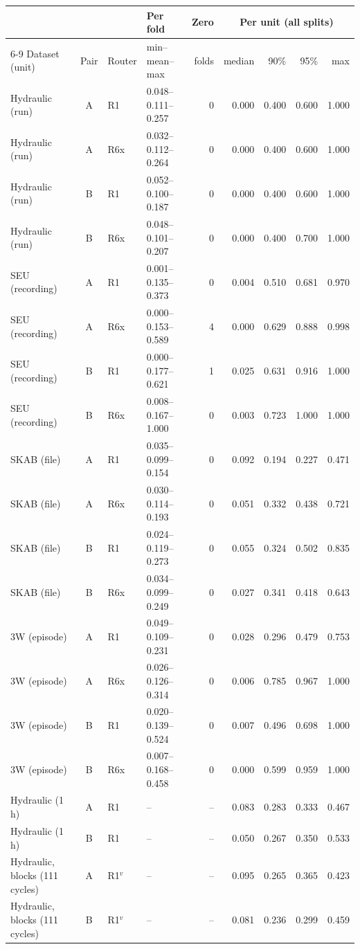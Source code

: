 \begin{tabular}{@{}l c l l r rrrr@{}}
\toprule
& & & Per fold & Zero & \multicolumn{4}{c}{Per unit (all splits)} \\
\cmidrule(l){6-9}
Dataset (unit) & Pair & Router & min--mean--max & folds & median & 90\% & 95\% & max \\
\midrule
Hydraulic (run) & A & R1 & 0.048--0.111--0.257 & 0 & 0.000 & 0.400 & 0.600 & 1.000 \\
Hydraulic (run) & A & R6x & 0.032--0.112--0.264 & 0 & 0.000 & 0.400 & 0.600 & 1.000 \\
Hydraulic (run) & B & R1 & 0.052--0.100--0.187 & 0 & 0.000 & 0.400 & 0.600 & 1.000 \\
Hydraulic (run) & B & R6x & 0.048--0.101--0.207 & 0 & 0.000 & 0.400 & 0.700 & 1.000 \\
SEU (recording) & A & R1 & 0.001--0.135--0.373 & 0 & 0.004 & 0.510 & 0.681 & 0.970 \\
SEU (recording) & A & R6x & 0.000--0.153--0.589 & 4 & 0.000 & 0.629 & 0.888 & 0.998 \\
SEU (recording) & B & R1 & 0.000--0.177--0.621 & 1 & 0.025 & 0.631 & 0.916 & 1.000 \\
SEU (recording) & B & R6x & 0.008--0.167--1.000 & 0 & 0.003 & 0.723 & 1.000 & 1.000 \\
SKAB (file) & A & R1 & 0.035--0.099--0.154 & 0 & 0.092 & 0.194 & 0.227 & 0.471 \\
SKAB (file) & A & R6x & 0.030--0.114--0.193 & 0 & 0.051 & 0.332 & 0.438 & 0.721 \\
SKAB (file) & B & R1 & 0.024--0.119--0.273 & 0 & 0.055 & 0.324 & 0.502 & 0.835 \\
SKAB (file) & B & R6x & 0.034--0.099--0.249 & 0 & 0.027 & 0.341 & 0.418 & 0.643 \\
3W (episode) & A & R1 & 0.049--0.109--0.231 & 0 & 0.028 & 0.296 & 0.479 & 0.753 \\
3W (episode) & A & R6x & 0.026--0.126--0.314 & 0 & 0.006 & 0.785 & 0.967 & 1.000 \\
3W (episode) & B & R1 & 0.020--0.139--0.524 & 0 & 0.007 & 0.496 & 0.698 & 1.000 \\
3W (episode) & B & R6x & 0.007--0.168--0.458 & 0 & 0.000 & 0.599 & 0.959 & 1.000 \\
\midrule
Hydraulic (1 h) & A & R1 & -- & -- & 0.083 & 0.283 & 0.333 & 0.467 \\
Hydraulic (1 h) & B & R1 & -- & -- & 0.050 & 0.267 & 0.350 & 0.533 \\
Hydraulic, blocks (111 cycles) & A & R1$^{v}$ & -- & -- & 0.095 & 0.265 & 0.365 & 0.423 \\
Hydraulic, blocks (111 cycles) & B & R1$^{v}$ & -- & -- & 0.081 & 0.236 & 0.299 & 0.459 \\
\bottomrule
\end{tabular}
